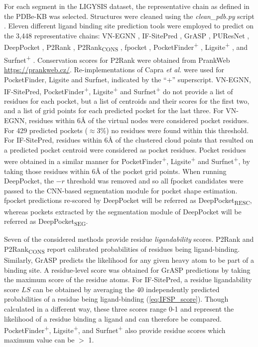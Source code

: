 For each segment in the LIGYSIS dataset, the representative chain as defined in the PDBe-KB was selected. Structures were cleaned using the \textit{clean\_pdb.py} script \cite{JUBB_2019_PDBTOOLS}. Eleven different ligand binding site prediction tools were employed to predict on the 3,448 representative chains: VN-EGNN \cite{SESTAK_2024_VNEGNN}, IF-SitePred \cite{CARBERY_2024_IFSP}, GrASP \cite{SMITH_2024_GrASP}, PUResNet \cite{KANDEL_2021_PURESNET, KANDEL_2024_PURESNET}, DeepPocket \cite{AGGARWAL_2022_DEEPPOCKET}, P2Rank \cite{KRIVAK_2015_P2RANK, KRIVAK_2018_P2RANK}, P2Rank\textsubscript{CONS} \cite{JENDELE_2019_PRANKWEB, JAKUBEC_2022_PRANKWEB}, fpocket \cite{GUILLOUX_2009_FPOCKET, SCHMIDTKE_2010_FPOCKET2}, PocketFinder\textsuperscript{+} \cite{AN_2005_POCKETFINDER}, Ligsite\textsuperscript{+} \cite{HENDLICH_1997_LIGSITE}, and Surfnet\textsuperscript{+} \cite{LASKOWSKI_1995_SURFNET}. Conservation scores for P2Rank were obtained from PrankWeb \url{https://prankweb.cz/}. Re-implementations of Capra \textit{et al.} \cite{CAPRA_2009_CONCAVITY} were used for PocketFinder, Ligsite and Surfnet, indicated by the ``+'' superscript. VN-EGNN, IF-SitePred, PocketFinder\textsuperscript{+}, Ligsite\textsuperscript{+} and Surfnet\textsuperscript{+} do not provide a list of residues for each pocket, but a list of centroids and their scores for the first two, and a list of grid points for each predicted pocket for the last three. For VN-EGNN, residues within 6\AA{} of the virtual nodes were considered pocket residues. For 429 predicted pockets ($\approx$3\%) no residues were found within this threshold. For IF-SitePred, residues within 6\AA{} of the clustered cloud points that resulted on a predicted pocket centroid were considered as pocket residues. Pocket residues were obtained in a similar manner for PocketFinder\textsuperscript{+}, Ligsite\textsuperscript{+} and Surfnet\textsuperscript{+}, by taking those residues within 6\AA{} of the pocket grid points. When running DeepPocket, the $-r$ threshold was removed and so all fpocket candidates were passed to the CNN-based segmentation module for pocket shape estimation. fpocket predictions re-scored by DeepPocket will be referred as DeepPocket\textsubscript{RESC}, whereas pockets extracted by the segmentation module of DeepPocket will be referred as DeepPocket\textsubscript{SEG}.

Seven of the considered methods provide residue \textit{ligandability} scores. P2Rank and P2Rank\textsubscript{CONS} report calibrated probabilities of residues being ligand-binding. Similarly, GrASP predicts the likelihood for any given heavy atom to be part of a binding site. A residue-level score was obtained for GrASP predictions by taking the maximum score of the residue atoms. For IF-SitePred, a residue ligandability score $LS$ can be obtained by averaging the 40 independently predicted probabilities of a residue being ligand-binding (\autoref{eq:IFSP_score}). Though calculated in a different way, these three scores range 0-1 and represent the likelihood of a residue binding a ligand and can therefore be compared. PocketFinder\textsuperscript{+}, Ligsite\textsuperscript{+}, and Surfnet\textsuperscript{+} also provide residue scores which maximum value can be $>$ 1.

